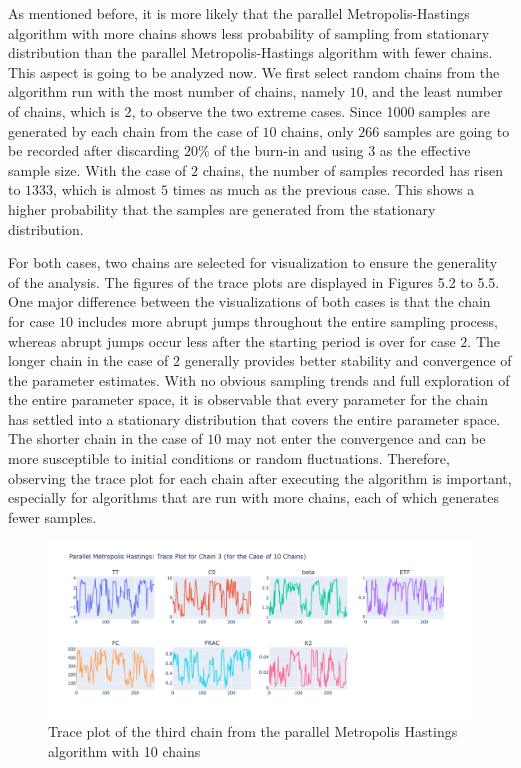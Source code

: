 As mentioned before, it is more likely that the parallel Metropolis-Hastings algorithm with more chains shows less probability of sampling from stationary distribution than the parallel Metropolis-Hastings algorithm with fewer chains. This aspect is going to be analyzed now. We first select random chains from the algorithm run with the most number of chains, namely $10$, and the least number of chains, which is $2$, to observe the two extreme cases. Since 1000 samples are generated by each chain from the case of $10$ chains, only $266$ samples are going to be recorded after discarding $20\%$ of the burn-in and using $3$ as the effective sample size. With the case of $2$ chains, the number of samples recorded has risen to $1333$, which is almost $5$ times as much as the previous case. This shows a higher probability that the samples are generated from the stationary distribution.

For both cases, two chains are selected for visualization to ensure the generality of the analysis. The figures of the trace plots are displayed in Figures 5.2 to 5.5. One major difference between the visualizations of both cases is that the chain for case $10$ includes more abrupt jumps throughout the entire sampling process, whereas abrupt jumps occur less after the starting period is over for case $2$. The longer chain in the case of $2$ generally provides better stability and convergence of the parameter estimates. With no obvious sampling trends and full exploration of the entire parameter space, it is observable that every parameter for the chain has settled into a stationary distribution that covers the entire parameter space. The shorter chain in the case of $10$ may not enter the convergence and can be more susceptible to initial conditions or random fluctuations. Therefore, observing the trace plot for each chain after executing the algorithm is important, especially for algorithms that are run with more chains, each of which generates fewer samples.

\begin{figure}[H]
    \centering
    \includegraphics[width=1\textwidth]{figures/parallel_mh/tp_rand_10_3.png}
    \captionsetup{width=.8\textwidth}
    \caption{Trace plot of the third chain from the parallel Metropolis Hastings algorithm with 10 chains}
    \label{fig:enter-label}
\end{figure}


